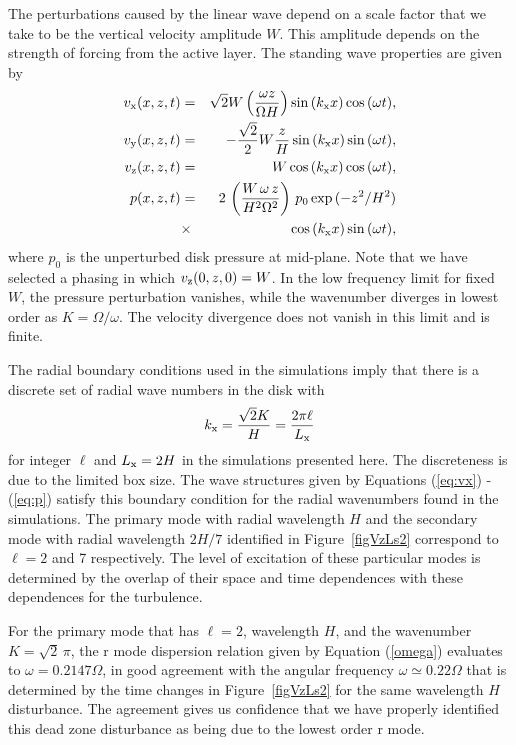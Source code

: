 The perturbations caused by the linear wave depend on a scale factor that
we take to be the vertical velocity amplitude $W$. This amplitude depends on the strength
of forcing from the active layer.
The standing wave properties are given by
\begin{eqnarray}
v_{\rm x} (x, z, t) &=& \sqrt{2} W   \left(\frac{\omega z}{ \Omega H}  \right) \sin{( k_{\rm x} x)} \cos{(\omega t)},
\label{eq:vx}\\
v_{\rm y} (x, z, t) &=& -\frac{\sqrt{2}}{2}  W  \frac{ z}{H}  \sin{(k_{\rm x} x)} \sin{(\omega t)}, \\
v_{\rm z} (x, z, t) &=& W  \cos{(k_{\rm x} x)} \cos{(\omega t)} ,\\
p(x, z, t) &=&  2 \,  \left( \frac{W\, \omega\, z}{H^2 \Omega^2} \right)\, p_0 \exp{(-z^2/H^2)}  \nonumber \\
& \times &  \cos{(k_{\rm x} x)} \sin{(\omega t)},
\label{eq:p}
\end{eqnarray}
where  $p_0$ is the unperturbed disk pressure at mid-plane.
Note that we have selected a phasing in which $v_{\rm z}(0,z,0)=W$.
In the low frequency limit for fixed $W$, the pressure perturbation vanishes, while the wavenumber diverges in lowest order as $K = \Omega/\omega$. The velocity divergence does not vanish in this limit and is finite.

The radial boundary conditions used in the simulations 
imply that there is a discrete set of radial wave numbers in the disk with
\begin{equation}
k_{\rm x} =  \frac{\sqrt{2} K}{H}=  \frac{2 \pi \ell}{L_{\rm x}}
\end{equation}
for integer $\ell$ and $L_{\rm x} = 2H$ in the simulations presented here.
The discreteness is due to the limited box size.
The wave structures given by Equations (\ref{eq:vx}) - (\ref{eq:p}) satisfy this boundary condition for the radial wavenumbers found in the simulations.  The  primary mode with radial wavelength $H$ and the secondary mode with radial wavelength $2 H/7$ identified in Figure~\ref{figVzLs2}
correspond to $\ell=2$ and 7 respectively.  The level of excitation of these particular modes is determined by the overlap of their space and time dependences with these dependences for the turbulence.

For the primary mode that has $\ell=2$, wavelength $H$, and the wavenumber $K=\sqrt{2}\, \pi$, the r mode dispersion relation
given by Equation (\ref{omega}) evaluates to $\omega = 0.2147 \Omega$, 
in good agreement with the angular frequency $\omega \simeq 0.22 \Omega$
that is determined by the time changes in Figure~\ref{figVzLs2} for the same wavelength $H$ disturbance. 
The agreement gives us confidence that we have properly identified this dead zone disturbance as being due to the lowest order r mode.  

